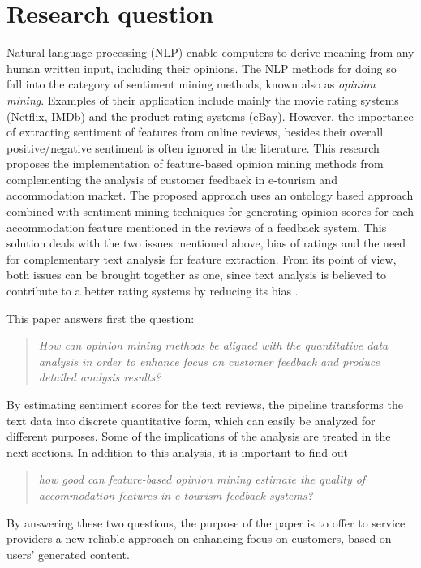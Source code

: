 {{\section{Research question}
Natural language processing (NLP) enable computers to derive meaning from any human written input, including their opinions. The NLP methods for doing so fall into the category of sentiment mining methods, known also as \textit{opinion mining}. Examples of their application include mainly the movie rating systems (Netflix, IMDb) and the product rating systems (eBay). However, the importance of extracting sentiment of features from online reviews, besides their overall positive/negative sentiment is often ignored in the literature. This research proposes the implementation of feature-based opinion mining methods from complementing the analysis of customer feedback in e-tourism and accommodation market. The proposed approach uses an ontology based approach combined with sentiment mining techniques for generating opinion scores for each accommodation feature mentioned in the reviews of a feedback system. This solution deals with the two issues mentioned above, bias of ratings and the need for complementary text analysis for feature extraction. From its point of view, both issues can be brought together as one, since text analysis is believed to contribute to a better rating systems by reducing its bias \cite{fradkin2016bias}.

This paper answers first the question:
\begin{quote}
 \textit{How can opinion mining methods be aligned with the quantitative data analysis in order to enhance focus on customer feedback and produce detailed analysis results?}
\end{quote}
 By estimating sentiment scores for the text reviews, the pipeline transforms the text data into discrete quantitative form, which can easily be analyzed for different purposes. Some of the implications of the analysis are treated in the next sections. In addition to this analysis, it is important to find out
 \begin{quote}
 \textit{how good can feature-based opinion mining estimate the quality of accommodation features in e-tourism feedback systems?}
\end{quote}
By answering these two questions, the purpose of the paper is to offer to service providers a new reliable approach on enhancing focus on customers, based on users' generated content.

}}
